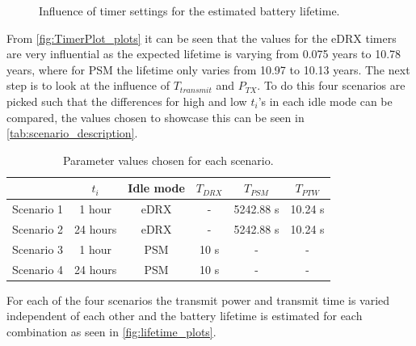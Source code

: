 \begin{figure}[H]
\centering
\begin{minipage}{0.48\textwidth}
\resizebox{\textwidth}{!}{
}
\end{minipage}
\hfill
\begin{minipage}{0.48\textwidth}
\resizebox{\textwidth}{!}{
}
\end{minipage}
\caption{Influence of timer settings for the estimated battery lifetime.}
\label{fig:TimerPlot_plots}
\end{figure}

From \autoref{fig:TimerPlot_plots} it can be seen that the values for the eDRX timers are very influential as the expected lifetime is varying  from 0.075 years to 10.78 years, where for PSM the lifetime only varies from 10.97 to 10.13 years. The next step is to look at the influence of $T_{transmit}$ and $P_{TX}$. To do this four scenarios are picked such that the differences for high and low $t_i$'s in each idle mode can be compared, the values chosen to showcase this can be seen in \autoref{tab:scenario_description}.


\begin{table}[H]
\centering
\begin{tabular}{|c|c|c|c|c|c|} \hline
			& $t_i$ 		& Idle mode	& $T_{DRX}$	& $T_{PSM}$	& $T_{PTW}$	\\ \hline
Scenario 1	& 1 hour 	& eDRX 		& -			& 5242.88 s	& 10.24 s	\\ \hline
Scenario 2	& 24 hours 	& eDRX 		& -			& 5242.88 s	& 10.24 s	\\ \hline
Scenario 3	& 1 hour 	& PSM		& 10 s		& -			& -			\\ \hline
Scenario 4	& 24 hours 	& PSM		& 10 s		& -			& -			\\ \hline
\end{tabular}
\caption{Parameter values chosen for each scenario.}
\label{tab:scenario_description}
\end{table}

For each of the four scenarios the transmit power and transmit time is varied independent of each other and the battery lifetime is estimated for each combination as seen in \autoref{fig:lifetime_plots}.


